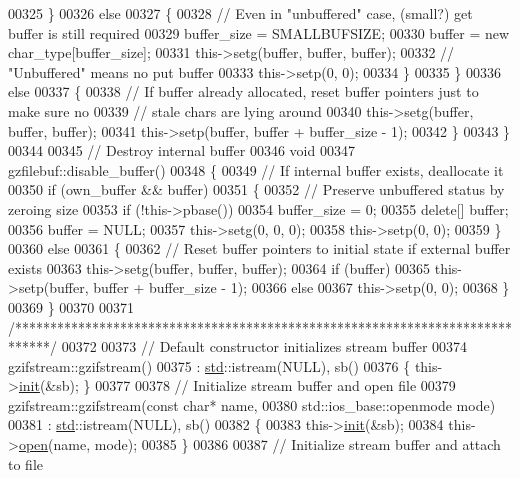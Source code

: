 \begin{DoxyCode}
{00325     \}
00326     \textcolor{keywordflow}{else}
00327     \{
00328       \textcolor{comment}{// Even in "unbuffered" case, (small?) get buffer is still required}
00329       buffer\_size = SMALLBUFSIZE;
00330       buffer = \textcolor{keyword}{new} char\_type[buffer\_size];
00331       this->setg(buffer, buffer, buffer);
00332       \textcolor{comment}{// "Unbuffered" means no put buffer}
00333       this->setp(0, 0);
00334     \}
00335   \}
00336   \textcolor{keywordflow}{else}
00337   \{
00338     \textcolor{comment}{// If buffer already allocated, reset buffer pointers just to make sure no}
00339     \textcolor{comment}{// stale chars are lying around}
00340     this->setg(buffer, buffer, buffer);
00341     this->setp(buffer, buffer + buffer\_size - 1);
00342   \}
00343 \}
00344 
00345 \textcolor{comment}{// Destroy internal buffer}
00346 \textcolor{keywordtype}{void}
00347 gzfilebuf::disable\_buffer()
00348 \{
00349   \textcolor{comment}{// If internal buffer exists, deallocate it}
00350   \textcolor{keywordflow}{if} (own\_buffer && buffer)
00351   \{
00352     \textcolor{comment}{// Preserve unbuffered status by zeroing size}
00353     \textcolor{keywordflow}{if} (!this->pbase())
00354       buffer\_size = 0;
00355     \textcolor{keyword}{delete}[] buffer;
00356     buffer = NULL;
00357     this->setg(0, 0, 0);
00358     this->setp(0, 0);
00359   \}
00360   \textcolor{keywordflow}{else}
00361   \{
00362     \textcolor{comment}{// Reset buffer pointers to initial state if external buffer exists}
00363     this->setg(buffer, buffer, buffer);
00364     \textcolor{keywordflow}{if} (buffer)
00365       this->setp(buffer, buffer + buffer\_size - 1);
00366     \textcolor{keywordflow}{else}
00367       this->setp(0, 0);
00368   \}
00369 \}
00370 
00371 \textcolor{comment}{/*****************************************************************************/}
00372 
00373 \textcolor{comment}{// Default constructor initializes stream buffer}
00374 gzifstream::gzifstream()
00375 : \hyperlink{namespacestd}{std}::istream(NULL), sb()
00376 \{ this->\hyperlink{structinit}{init}(&sb); \}
00377 
00378 \textcolor{comment}{// Initialize stream buffer and open file}
00379 gzifstream::gzifstream(\textcolor{keyword}{const} \textcolor{keywordtype}{char}* name,
00380                        std::ios\_base::openmode mode)
00381 : \hyperlink{namespacestd}{std}::istream(NULL), sb()
00382 \{
00383   this->\hyperlink{structinit}{init}(&sb);
00384   this->\hyperlink{classgzofstream_aee3eb31f07eda7f5ad1f60d59ea4b239}{open}(name, mode);
00385 \}
00386 
00387 \textcolor{comment}{// Initialize stream buffer and attach to file}
}
\end{DoxyCode}
